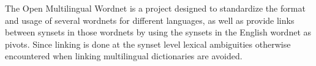 The Open Multilingual Wordnet \citep{bond2012wordnet, bond2013linking} is a project designed to standardize the format and usage of several wordnets for different languages, as well as provide links between synsets in those wordnets by using the synsets in the English wordnet as pivots. Since linking is done at the synset level lexical ambiguities otherwise encountered when linking multilingual dictionaries are avoided. 



